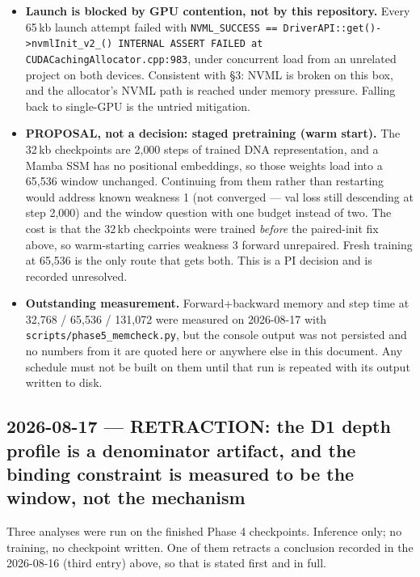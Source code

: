 \documentclass[11pt,a4paper]{article}
\newcommand{\code}[1]{\texttt{\small #1}}
\begin{document}
\begin{itemize}
\item \textbf{Launch is blocked by GPU contention, not by this repository.}
Every 65\,kb launch attempt failed with
\code{NVML\_SUCCESS == DriverAPI::get()->nvmlInit\_v2\_() INTERNAL ASSERT
FAILED at CUDACachingAllocator.cpp:983}, under concurrent load from an
unrelated project on both devices. Consistent with \S3: NVML is broken on this
box, and the allocator's NVML path is reached under memory pressure. Falling
back to single-GPU is the untried mitigation.

\item \textbf{PROPOSAL, not a decision: staged pretraining (warm start).} The
32\,kb checkpoints are 2{,}000 steps of trained DNA representation, and a
Mamba SSM has no positional embeddings, so those weights load into a 65{,}536
window unchanged. Continuing from them rather than restarting would address
known weakness 1 (not converged --- val loss still descending at step 2{,}000)
and the window question with one budget instead of two. The cost is that the
32\,kb checkpoints were trained \emph{before} the paired-init fix above, so
warm-starting carries weakness 3 forward unrepaired. Fresh training at
65{,}536 is the only route that gets both. This is a PI decision and is
recorded unresolved.

\item \textbf{Outstanding measurement.} Forward+backward memory and step time
at 32{,}768 / 65{,}536 / 131{,}072 were measured on 2026-08-17 with
\code{scripts/phase5\_memcheck.py}, but the console output was not persisted
and no numbers from it are quoted here or anywhere else in this document. Any schedule must not be built on them until that run is repeated with its
output written to disk.

\end{itemize}
\subsection*{2026-08-17 --- RETRACTION: the D1 depth profile is a denominator
artifact, and the binding constraint is measured to be the window, not the
mechanism}

Three analyses were run on the finished Phase 4 checkpoints. Inference only; no
training, no checkpoint written. One of them retracts a conclusion recorded in
the 2026-08-16 (third entry) above, so that is stated first and in full.
\end{document}
